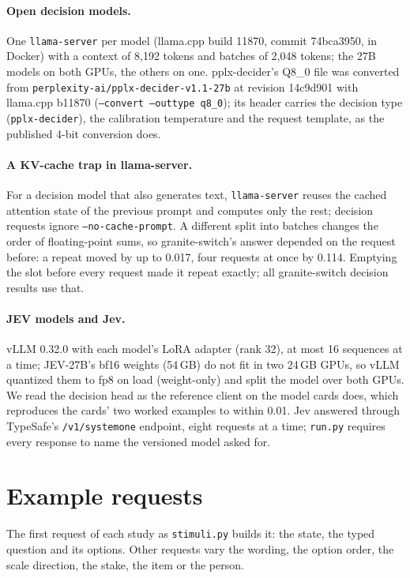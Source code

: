 \documentclass[11pt]{article}
\begin{document}
\paragraph{Open decision models.} One \texttt{llama-server} per model (llama.cpp build 11870, commit 74bca3950, in Docker) with a context of 8,192 tokens and batches of 2,048 tokens; the 27B models on both GPUs, the others on one. pplx-decider's Q8\_0 file was converted from \texttt{perplexity-ai/pplx-decider-v1.1-27b} at revision 14c9d901 with llama.cpp b11870 (\texttt{--convert --outtype q8\_0}); its header carries the decision type (\texttt{pplx-decider}), the calibration temperature and the request template, as the published 4-bit conversion does.

\paragraph{A KV-cache trap in llama-server.} For a decision model that also generates text, \texttt{llama-server} reuses the cached attention state of the previous prompt and computes only the rest; decision requests ignore \texttt{--no-cache-prompt}. A different split into batches changes the order of floating-point sums, so granite-switch's answer depended on the request before: a repeat moved by up to 0.017, four requests at once by 0.114. Emptying the slot before every request made it repeat exactly; all granite-switch decision results use that.

\paragraph{JEV models and Jev.} vLLM 0.32.0 with each model's LoRA adapter (rank 32), at most 16 sequences at a time; JEV-27B's bf16 weights (54\,GB) do not fit in two 24\,GB GPUs, so vLLM quantized them to fp8 on load (weight-only) and split the model over both GPUs. We read the decision head as the reference client on the model cards does, which reproduces the cards' two worked examples to within 0.01. Jev answered through TypeSafe's \texttt{/v1/systemone} endpoint, eight requests at a time; \texttt{run.py} requires every response to name the versioned model asked for.

\section{Example requests}
\label{app:examples}

The first request of each study as \texttt{stimuli.py} builds it: the state, the typed question and its options. Other requests vary the wording, the option order, the scale direction, the stake, the item or the person.
\end{document}
